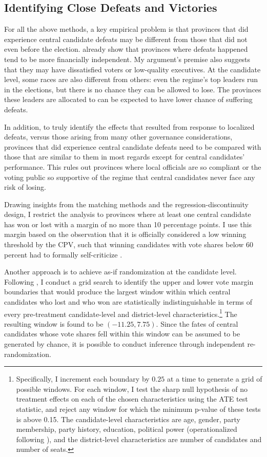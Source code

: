 \documentclass[12pt]{article}
\newcommand\fnote[1]{\footnote{\baselineskip=2\normalbaselineskip#1}}
\newcommand{\1}{\mathbbm{1}}
\begin{document}
\subsection{Identifying Close Defeats and Victories}
\label{sec:methods_sample}

For all the above methods, a key empirical problem is that provinces that did experience central candidate defeats may be different from those that did not even before the election. \citet{MaleskySchuler2011} already show that provinces where defeats happened tend to be more financially independent. My argument's premise also suggests that they may have dissatisfied voters or low-quality executives. At the candidate level, some races are also different from others: even the regime's top leaders run in the elections, but there is no chance they can be allowed to lose. The provinces these leaders are allocated to can be expected to have lower chance of suffering defeats. 

In addition, to truly identify the effects that resulted from response to localized defeats, versus those arising from many other governance considerations, provinces that did experience central candidate defeats need to be compared with those that are similar to them in most regards except for central candidates' performance. This rules out provinces where local officials are so compliant or the voting public so supportive of the regime that central candidates never face any risk of losing.

Drawing insights from the matching methods and the regression-discontinuity design, I restrict the analysis to provinces where at least one central candidate has won or lost with a margin of no more than 10 percentage points. I use this margin based on the observation that it is officially considered a low winning threshold by the CPV, such that winning candidates with vote shares below 60 percent had to formally self-criticize \citep{MaleskySchuler2011}. 

Another approach is to achieve as-if randomization at the candidate level. Following \citet{CattaneoTitiunik2015}, I conduct a grid search to identify the upper and lower vote margin boundaries that would produce the largest window within which central candidates who lost and who won are statistically indistinguishable in terms of every pre-treatment candidate-level and district-level characteristics.\fnote{Specifically, I increment each boundary by $0.25$ at a time to generate a grid of possible windows. For each window, I test the sharp null hypothesis of no treatment effects on each of the chosen characteristics using the ATE test statistic, and reject any window for which the minimum p-value of these tests is above 0.15. The candidate-level characteristics are age, gender, party membership, party history, education, political power (operationalized following \citet{MaleskySchuler2011}), and the district-level characteristics are number of candidates and number of seats.} The resulting window is found to be $(-11.25, 7.75)$. Since the fates of central candidates whose vote shares fell within this window can be assumed to be generated by chance, it is possible to conduct inference through independent re-randomization. 
\end{document}
